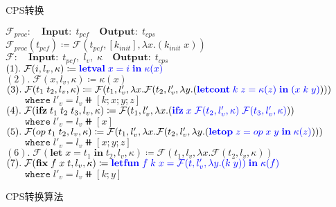 \begin{figure}[t]
    \centering
    \begin{algorithm}[H]
        \caption{CPS转换}
        \SetAlgoLined
        $\mathcal{F}_{proc}:\quad \mathbf{Input:}\; t_{pcf}\quad \mathbf{Output:}\; t_{cps}$\\
        $\mathcal{F}_{proc}(t_{pcf})\coloneqq \mathbf{\mathcal{F}}(t_{pcf}, [k_{init}], \lambda x. (k_{init}\; x))$\\
        \vspace*{0.5em}
        $\mathcal{F}:\quad \mathbf{Input:}\; t_{pcf},\; l_v,\; \kappa \quad \mathbf{Output:}\; t_{cps}$\\ 
        $(1).\; \mathbf{\mathcal{F}}(i, l_v, \kappa) \coloneqq \textcolor{blue}{\mathbf{letval}\; x= i\; \mathbf{in}\; \kappa(x)} $ \\
        $(2).\; \mathbf{\mathcal{F}}(x, l_v, \kappa) \coloneqq \kappa(x) $ \\
        $(3).\; \mathbf{\mathcal{F}}(t_1\; t_2, l_v, \kappa) \coloneqq \mathbf{\mathcal{F}}(t_1, l'_v,\lambda x. \mathbf{\mathcal{F}}(t_2, l'_v, \lambda y. (\textcolor{blue}{\mathbf{letcont}\; k\; z=\kappa(z)\; \mathbf{in}\; (x\; k\; y)})))$ \\
        $\quad\quad \mathtt{where}\; l'_v = l_v \doubleplus [k;x;y;z]$ \\
        $(4).\; \mathbf{\mathcal{F}}(\mathbf{ifz}\; t_1\; t_2\; t_3, l_v, \kappa) \coloneqq \mathbf{\mathcal{F}}(t_1, l'_v, \lambda x. (\textcolor{blue}{\mathbf{ifz}\; x\; \mathbf{\mathcal{F}}(t_2, l'_v, \kappa)\; \mathbf{\mathcal{F}}(t_3, l'_v, \kappa)}))  $ \\
        $\quad\quad \mathtt{where}\; l'_v = l_v \doubleplus [x]$ \\
        $(5).\; \mathbf{\mathcal{F}}(op\; t_1\; t_2, l_v, \kappa) \coloneqq \mathbf{\mathcal{F}}(t_1, l'_v,\lambda x.\mathbf{\mathcal{F}}(t_2, l'_v, \lambda y. (\textcolor{blue}{\mathbf{letop}\; z=op\; x\; y\; \mathbf{in}\; \kappa(z)}))) $ \\
        $\quad\quad \mathtt{where}\; l'_v = l_v \doubleplus [x;y;z]$ \\
        $(6).\; \mathbf{\mathcal{F}}(\mathbf{let}\; x=t_1\; \mathbf{in}\; t_2, l_v, \kappa) \coloneqq \mathbf{\mathcal{F}}(t_1, l_v, \lambda x. \mathbf{\mathcal{F}}(t_2, l_v, \kappa)) $ \\
        $(7).\; \mathbf{\mathcal{F}}(\mathbf{fix}\; f\; x\; t, l_v, \kappa) \coloneqq \textcolor{blue}{\mathbf{letfun}\; f\; k\; x= \mathbf{\mathcal{F}}(t, l'_v, \lambda y. (k\; y))\; \mathbf{in}\; \kappa(f)}$ \\
        $\quad\quad \mathtt{where}\; l'_v = l_v \doubleplus [k;y]$
    \end{algorithm}
    \caption{CPS转换算法}\label{algo:cpstrans}
\end{figure}

